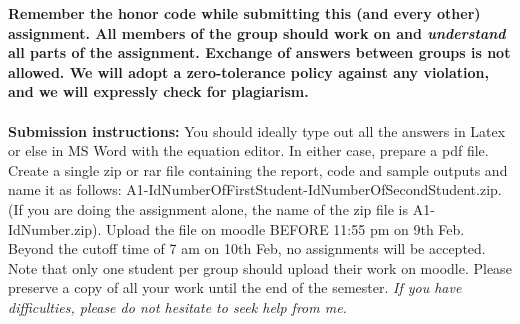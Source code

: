 \documentclass[11pt]{article}
\begin{document}
\maketitle

\textbf{Remember the honor code while submitting this (and every other) assignment. All members of the group should work on and \emph{understand} all parts of the assignment. Exchange of answers between groups is not allowed. We will adopt a \textbf{zero-tolerance policy} against any violation, and we will expressly check for plagiarism.}
\\
\\
\textbf{Submission instructions:} You should ideally type out all the answers in Latex or else in MS Word with the equation editor. In either case, prepare a pdf file. Create a single zip or rar file containing the report, code and sample outputs and name it as follows: A1-IdNumberOfFirstStudent-IdNumberOfSecondStudent.zip. (If you are doing the assignment alone, the name of the zip file is A1-IdNumber.zip). Upload the file on moodle BEFORE 11:55 pm on 9th Feb. Beyond the cutoff time of 7 am on 10th Feb, no assignments will be accepted. Note that only one student per group should upload their work on moodle. Please preserve a copy of all your work until the end of the semester. \emph{If you have difficulties, please do not hesitate to seek help from me.} 
\end{document}
